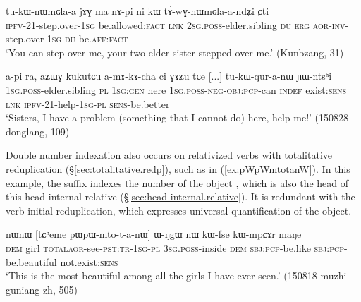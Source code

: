 \begin{exe}
\ex   \label{ex:tAwGnWmGlaandZi}
\gll tu-kɯ-nɯmɢla-a jɤɣ ma nɤ-pi ni kɯ tɤ́-wɣ-nɯmɢla-a-ndʑi ɕti \\
\textsc{ipfv}-2\fl{}1-step.over-\textsc{1sg} be.allowed:\textsc{fact} \textsc{lnk} \textsc{2sg}.\textsc{poss}-elder.sibling \textsc{du} \textsc{erg} \textsc{aor}-\textsc{inv}-step.over-\textsc{1sg}-\textsc{du} be.\textsc{aff}:\textsc{fact} \\
\glt `You can step over me, your two elder sister stepped over me.' (Kunbzang, 31)
\end{exe}

\begin{exe}
\ex   \label{ex:tukWquranW.YWntshi}
\gll  a-pi ra, aʑɯɣ kukutɕu a-mɤ-kɤ-cha ci ɣɤʑu tɕe [...] tu-kɯ-qur-a-nɯ ɲɯ-ntsʰi \\
\textsc{1sg}.\textsc{poss}-elder.sibling \textsc{pl} \textsc{1sg}:\textsc{gen} here \textsc{1sg}.\textsc{poss}-\textsc{neg}-\textsc{obj}:\textsc{pcp}-can \textsc{indef} exist:\textsc{sens} \textsc{lnk} { } \textsc{ipfv}-2\fl{}1-help-\textsc{1sg}-\textsc{pl} \textsc{sens}-be.better \\
\glt `Sisters, I have a problem (something that I cannot do) here, help me!' (150828 donglang, 109)
\end{exe}

Double number indexation also occurs on relativized verbs with totalitative reduplication (§\ref{sec:totalitative.redp}),  such as  in (\ref{ex:pWpWmtotanW}). In this example, the suffix  indexes the number of the object , which is also the head of this head-internal relative (§\ref{sec:head-internal.relative}). It is redundant with the verb-initial reduplication, which expresses universal quantification of the object.

\begin{exe}
\ex   \label{ex:pWpWmtotanW}
\gll nɯnɯ [tɕʰeme pɯ\redp{}pɯ-mto-t-a-nɯ] ɯ-ŋgɯ nɯ kɯ-fse kɯ-mpɕɤr maŋe \\
\textsc{dem} girl \textsc{total}\redp{}\textsc{aor}-see-\textsc{pst}:\textsc{tr}-\textsc{1sg}-\textsc{pl} \textsc{3sg}.\textsc{poss}-inside \textsc{dem} \textsc{sbj}:\textsc{pcp}-be.like \textsc{sbj}:\textsc{pcp}-be.beautiful not.exist:\textsc{sens} \\
\glt `This is the most beautiful among all the girls I have ever seen.' (150818 muzhi guniang-zh, 505)
\end{exe}



